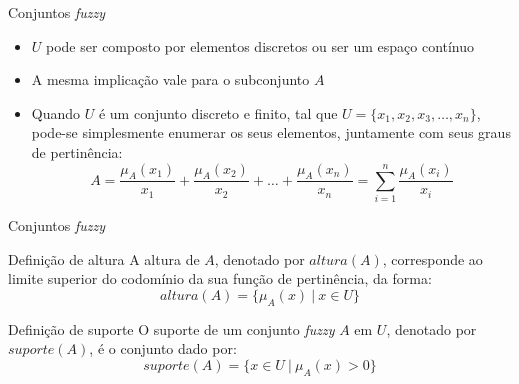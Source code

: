 \begin{frame}{Conjuntos \emph{fuzzy}}
\begin{itemize}
    \item $U$ pode ser composto por elementos discretos ou ser um espaço contínuo
    \item A mesma implicação vale para o subconjunto $A$
    \item Quando $U$ é um conjunto discreto e finito, tal que $U = \{x_1, x_2, x_3, \ldots, x_n\}$, pode-se simplesmente enumerar os seus elementos, juntamente com seus graus de pertinência:
\begin{equation*}
  A =  \frac{\mu_A(x_1)}{x_1} + \frac{\mu_A(x_2)}{x_2} + \ldots + \frac{\mu_A(x_n)}{x_n} = \sum_{i=1}^n \frac{\mu_A(x_i)}{x_i}
\end{equation*}
\end{itemize}

\end{frame}

\begin{frame}{Conjuntos \emph{fuzzy}}
\begin{block}{Definição de altura}
A altura de $A$, denotado por $altura(A)$, corresponde ao limite superior do codomínio da sua função de pertinência, da forma:
\begin{equation*}
  altura(A) = \{\mu_A(x) \ |\ x \in U\}
\label{equ:conjunto_fuzzy_altura}
\end{equation*}
\end{block}

\begin{block}{Definição de suporte}
O suporte de um conjunto \emph{fuzzy} $A$ em $U$, denotado por $suporte(A)$, é o conjunto dado por:
\begin{equation*}
  suporte(A) = \{x \in U \ |\ \mu_A(x) > 0 \}
\end{equation*}
\end{block}

\end{frame}

